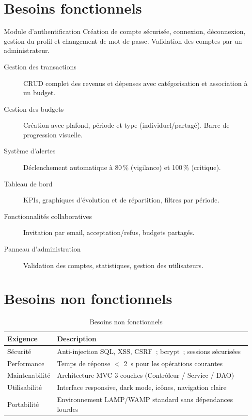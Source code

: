 \documentclass[12pt,a4paper,twoside]{report}
\begin{document}
\section{Besoins fonctionnels}

\begin{infobox}{Module d'authentification}
  Création de compte sécurisée, connexion, déconnexion, gestion du profil et changement de mot de passe. Validation des comptes par un administrateur.
\end{infobox}

\begin{description}
  \item[Gestion des transactions] CRUD complet des revenus et dépenses avec catégorisation et association à un budget.
  \item[Gestion des budgets] Création avec plafond, période et type (individuel/partagé). Barre de progression visuelle.
  \item[Système d'alertes] Déclenchement automatique à 80\,\% (vigilance) et 100\,\% (critique).
  \item[Tableau de bord] KPIs, graphiques d'évolution et de répartition, filtres par période.
  \item[Fonctionnalités collaboratives] Invitation par email, acceptation/refus, budgets partagés.
  \item[Panneau d'administration] Validation des comptes, statistiques, gestion des utilisateurs.
\end{description}

\section{Besoins non fonctionnels}

\begin{table}[H]
  \centering
  \begin{tabularx}{\textwidth}{lL}
    \toprule
    \textbf{Exigence} & \textbf{Description} \\
    \midrule
    Sécurité & Anti-injection SQL, XSS, CSRF~; bcrypt~; sessions sécurisées \\
    Performance & Temps de réponse $<$ 2~s pour les opérations courantes \\
    Maintenabilité & Architecture MVC 3 couches (Contrôleur / Service / DAO) \\
    Utilisabilité & Interface responsive, dark mode, icônes, navigation claire \\
    Portabilité & Environnement LAMP/WAMP standard sans dépendances lourdes \\
    \bottomrule
  \end{tabularx}
  \caption{Besoins non fonctionnels}
\end{table}
\end{document}
